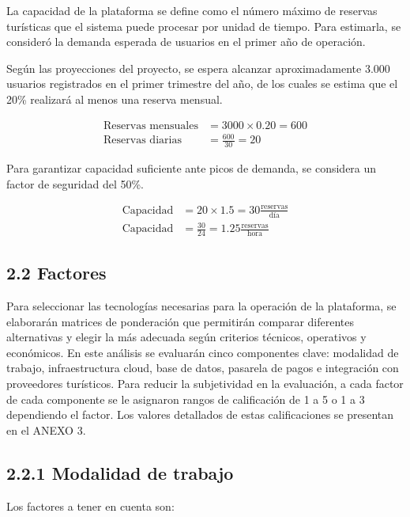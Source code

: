 \documentclass[12pt,a4paper]{article}
\newcommand{\subsectiontitle}[1]{\subsection{#1}}
\begin{document}
La capacidad de la plataforma se define como el número máximo de reservas turísticas que el sistema puede procesar por unidad de tiempo. Para estimarla, se consideró la demanda esperada de usuarios en el primer año de operación.

Según las proyecciones del proyecto, se espera alcanzar aproximadamente 3.000 usuarios registrados en el primer trimestre del año, de los cuales se estima que el 20\% realizará al menos una reserva mensual.

\begin{align}
\text{Reservas mensuales} &= 3000 \times 0.20 = 600\\
\text{Reservas diarias} &= \frac{600}{30} = 20
\end{align}

Para garantizar capacidad suficiente ante picos de demanda, se considera un factor de seguridad del 50\%.

\begin{align}
\text{Capacidad} &= 20 \times 1.5 = 30 \frac{\text{reservas}}{\text{día}}\\
\text{Capacidad} &= \frac{30}{24} = 1.25 \frac{\text{reservas}}{\text{hora}}
\end{align}

\subsectiontitle{2.2 Factores}

Para seleccionar las tecnologías necesarias para la operación de la plataforma, se elaborarán matrices de ponderación que permitirán comparar diferentes alternativas y elegir la más adecuada según criterios técnicos, operativos y económicos. En este análisis se evaluarán cinco componentes clave: modalidad de trabajo, infraestructura cloud, base de datos, pasarela de pagos e integración con proveedores turísticos. Para reducir la subjetividad en la evaluación, a cada factor de cada componente se le asignaron rangos de calificación de 1 a 5 o 1 a 3 dependiendo el factor. Los valores detallados de estas calificaciones se presentan en el ANEXO 3.

\subsectiontitle{2.2.1 Modalidad de trabajo}

Los factores a tener en cuenta son:
\end{document}
